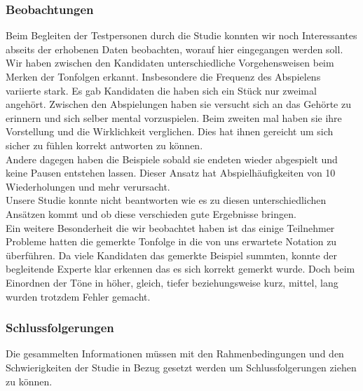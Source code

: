 \documentclass{acm_proc_article-sp}
\begin{document}
\subsubsection{Beobachtungen}
Beim Begleiten der Testpersonen durch die Studie konnten wir noch Interessantes abseits der erhobenen Daten beobachten, worauf hier eingegangen werden soll.\\

Wir haben zwischen den Kandidaten unterschiedliche Vorgehensweisen beim Merken der Tonfolgen erkannt. Insbesondere die Frequenz des Abspielens variierte stark. Es gab Kandidaten die haben sich ein Stück nur zweimal angehört. Zwischen den Abspielungen haben sie versucht sich an das Gehörte zu erinnern und sich selber mental vorzuspielen. Beim zweiten mal haben sie ihre Vorstellung und die Wirklichkeit verglichen. Dies hat ihnen gereicht um sich sicher zu fühlen korrekt antworten zu können.\\
Andere dagegen haben die Beispiele sobald sie endeten wieder abgespielt und keine Pausen entstehen lassen. Dieser Ansatz hat Abspielhäufigkeiten von 10 Wiederholungen und mehr verursacht.\\ 
Unsere Studie konnte nicht beantworten wie es zu diesen unterschiedlichen Ansätzen kommt und ob diese verschieden gute Ergebnisse bringen.\\

Ein weitere Besonderheit die wir beobachtet haben ist das einige Teilnehmer Probleme hatten die gemerkte Tonfolge in die von uns erwartete Notation zu überführen. Da viele Kandidaten das gemerkte Beispiel summten, konnte der begleitende Experte klar erkennen das es sich korrekt gemerkt wurde. Doch beim Einordnen der Töne in höher, gleich, tiefer beziehungsweise kurz, mittel, lang wurden trotzdem Fehler gemacht.

\subsubsection{Schlussfolgerungen}
Die gesammelten Informationen müssen mit den Rahmenbedingungen und den Schwierigkeiten der Studie in Bezug gesetzt werden um Schlussfolgerungen ziehen zu können.
\end{document}
